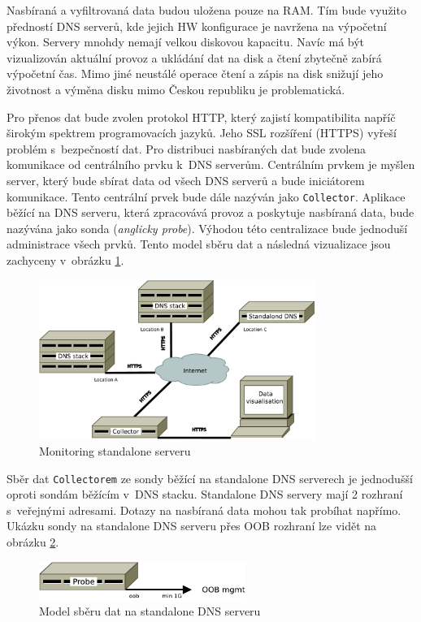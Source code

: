 \documentclass[thesis=M,czech]{src/FITthesis}[2019/12/23]
\begin{document}
Nasbíraná a vyfiltrovaná data budou uložena pouze na RAM. Tím bude využito předností DNS serverů, kde jejich HW konfigurace je navržena na výpočetní výkon. Servery mnohdy nemají velkou diskovou kapacitu. Navíc má být vizualizován aktuální provoz a ukládání dat na disk a čtení zbytečně zabírá výpočetní čas. Mimo jiné neustálé operace čtení a zápis na disk snižují jeho životnost a výměna disku mimo Českou republiku je problematická.  

Pro přenos dat bude zvolen protokol HTTP, který zajistí kompatibilita napříč širokým spektrem programovacích jazyků. Jeho SSL rozšíření (HTTPS) vyřeší problém s~bezpečností dat. Pro distribuci nasbíraných dat bude zvolena komunikace od centrálního prvku k~DNS serverům. Centrálním prvkem je myšlen server, který bude sbírat data od všech DNS serverů a bude iniciátorem komunikace. Tento centrální prvek bude dále nazýván jako \texttt{Collector}. Aplikace běžící na DNS serveru, která zpracovává provoz a poskytuje nasbíraná data, bude nazývána jako sonda (\textit{anglicky probe}). Výhodou této centralizace bude jednoduší administrace všech prvků. Tento model sběru dat a následná vizualizace jsou zachyceny v~obrázku \ref{fig:monitoring}. 

\begin{figure}[ht]
  \centering
   \includegraphics[width=0.8\textwidth]{images/monitoring.pdf}
   \caption{Monitoring standalone serveru}
     \label{fig:monitoring}
\end{figure}


Sběr dat \texttt{Collectorem} ze sondy běžící na standalone DNS serverech je jednodušší oproti sondám běžícím v~DNS stacku. Standalone DNS servery mají 2 rozhraní s~veřejnými adresami. Dotazy na nasbíraná data mohou tak probíhat napřímo. Ukázku sondy na standalone DNS serveru přes OOB rozhraní lze vidět na obrázku \ref{fig:monitor-standalone}. 


\begin{figure}[ht]
  \centering
   \includegraphics[width=0.6\textwidth]{images/monitoring-standalone.pdf}
   \caption{Model sběru dat na standalone DNS serveru}
     \label{fig:monitor-standalone}
\end{figure}
\end{document}
